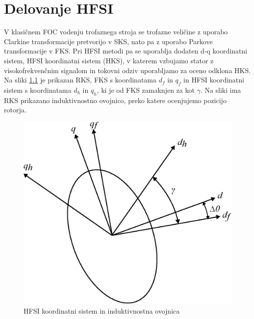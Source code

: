 \documentclass[a4paper,twoside,openright,12pt,slovene]{book}
\begin{document}
\chapter{Delovanje HFSI} \label{teorija}


V klasičnem FOC vodenju trofaznega stroja se trofazne veličine z uporabo Clarkine transformacije pretvorijo v SKS, nato pa z uporabo Parkove transformacije v FKS. Pri HFSI metodi pa se uporablja
dodaten d-q koordinatni sistem, HFSI koordinatni sistem (HKS), v katerem vzbujamo stator z visokofrekvenčnim signalom in tokovni odziv uporabljamo za oceno odklona HKS. Na sliki
\ref{koordinatniSistem} je prikazan RKS, FKS s koordinatama $d_f$ in $q_f$ in HFSI koordinatni sistem s koordinatama $d_h$ in $q_h$, ki je od FKS zamaknjen za kot $\gamma$. Na sliki ima RKS prikazano
induktivnostno ovojnico, preko katere ocenjujemo pozicijo rotorja.

\begin{figure}[!htbp]
    \centering
    \includegraphics[width=0.7\columnwidth]{Slike/Inkscape/koordinatniSistem.eps}
    \caption{\label{koordinatniSistem} HFSI koordinatni sistem in induktivnostna ovojnica}
\end{figure}
\end{document}

